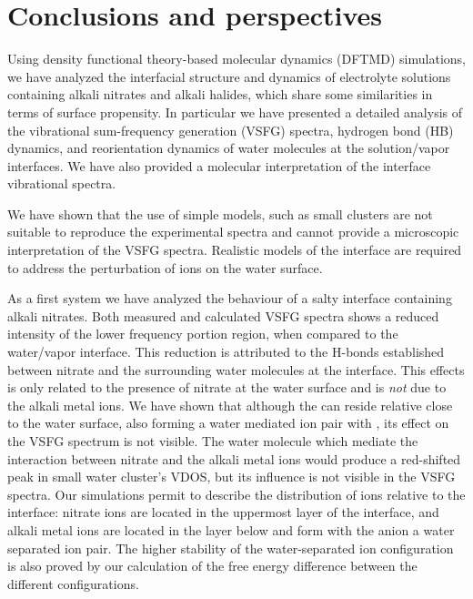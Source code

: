 \chapter{Conclusions and perspectives}\label{CHAPTER_Summary}
Using density functional theory-based molecular dynamics (DFTMD) simulations, we have analyzed the interfacial structure and dynamics of electrolyte solutions containing alkali nitrates and alkali halides,
which share some similarities in terms of surface propensity.
In particular we have presented a detailed analysis of the vibrational sum-frequency generation (VSFG) spectra, hydrogen bond (HB) dynamics, and reorientation dynamics of water molecules at the solution/vapor interfaces. 
We have also provided a molecular interpretation of the interface vibrational spectra. 

We have shown that the use of simple models, such as small clusters are not suitable to reproduce the experimental spectra 
and cannot provide a microscopic interpretation of the VSFG spectra. Realistic models of the interface are required to address the 
perturbation of ions on the water surface. 

As a first system we have analyzed the behaviour of a salty interface containing alkali nitrates.
Both measured and calculated VSFG spectra shows a reduced intensity of the lower frequency portion region, 
when compared to the water/vapor interface. 
This reduction is attributed to the H-bonds established between nitrate and the surrounding water molecules at the interface.
This effects is only related to the presence of nitrate at the water surface and is \emph{not} due to the alkali metal ions.
We have shown that although the \Li can reside relative close to the water surface, also forming a water mediated
ion pair with \nit, its effect on the VSFG spectrum is not visible. The water molecule which mediate the interaction 
between nitrate and the alkali metal ions would produce a red-shifted peak in small water cluster's VDOS, but its influence is not visible 
in the VSFG spectra. Our simulations permit to describe the distribution of ions relative to the interface: 
nitrate ions are located in the uppermost layer of the interface, and alkali metal ions are located in the layer below 
and form with the anion a water separated ion pair.
The higher stability of the water-separated ion configuration is also proved by our calculation of the free energy difference between the different configurations. 

